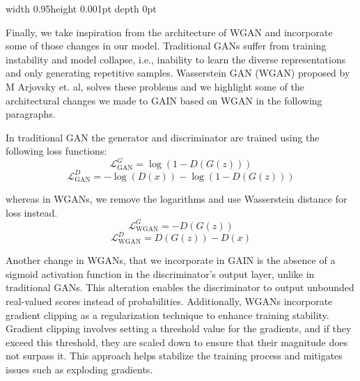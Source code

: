 \textcolor{gray!80}{\vrule width 0.95\columnwidth height 0.001pt depth 0pt \relax}

\vspace{1ex}

Finally, we take inspiration from the architecture of WGAN and incorporate some of those changes in our model. Traditional GANs suffer from training instability and model collapse, i.e., inability to learn the diverse representations and only generating repetitive samples. Wasserstein GAN (WGAN) proposed by M Arjovsky et. al, solves these problems and we highlight some of the architectural changes we made to GAIN based on WGAN in the following paragraphs.

In traditional GAN the generator and discriminator are trained using the following loss functions:
\[
\mathcal{L}_{\text{GAN}}^G = \log(1 - D(G(z)))
\]
\[
\mathcal{L}_{\text{GAN}}^D = -\log(D(x)) - \log(1 - D(G(z)))
\]

whereas in WGANs, we remove the logarithms and use Wasserstein distance for loss instead.
\[
\mathcal{L}_{\text{WGAN}}^G = -D(G(z))
\]
\[
\mathcal{L}_{\text{WGAN}}^D = D(G(z)) - D(x)
\]

Another change in WGANs, that we incorporate in GAIN is the absence of a sigmoid activation function in the discriminator's output layer, unlike in traditional GANs. This alteration enables the discriminator to output unbounded real-valued scores instead of probabilities. Additionally, WGANs incorporate gradient clipping as a regularization technique to enhance training stability. Gradient clipping involves setting a threshold value for the gradients, and if they exceed this threshold, they are scaled down to ensure that their magnitude does not surpass it. This approach helps stabilize the training process and mitigates issues such as exploding gradients.
